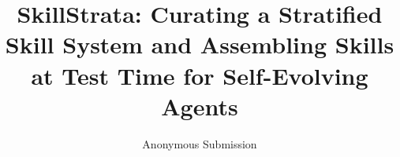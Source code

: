 \documentclass[letterpaper]{article} %
\title{SkillStrata: Curating a Stratified Skill System and Assembling Skills at Test Time for Self-Evolving Agents}
\author{
    Anonymous Submission
}
\begin{document}
\maketitle

\begin{abstract}

\end{abstract}











\end{document}
